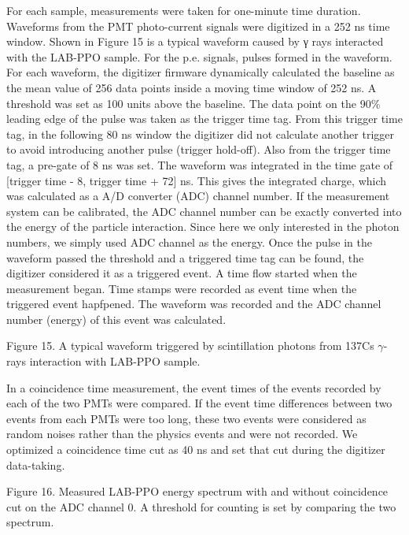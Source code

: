 For each sample, measurements were taken for one-minute time duration. Waveforms from the PMT photo-current signals were digitized in a 252 ns time window. Shown in Figure 15 is a typical waveform caused by γ rays interacted with the LAB-PPO sample. For the p.e. signals, pulses formed in the waveform. For each waveform, the digitizer firmware dynamically calculated the baseline as the mean value of 256 data points inside a moving time window of 252 ns. A threshold was set as 100 units above the baseline. The data point on the 90\% leading edge of the pulse was taken as the trigger time tag. From this trigger time tag, in the following 80 ns window the digitizer did not calculate another trigger to avoid introducing another pulse (trigger hold-off). Also from the trigger time tag, a pre-gate of 8 ns was set. The waveform was integrated in the time gate of  [trigger time - 8,  trigger time + 72] ns. This gives the integrated charge, which was calculated as a A/D converter (ADC) channel number. If the measurement system can be calibrated, the ADC channel number can be exactly converted into the energy of the particle interaction. Since here we only interested in the photon numbers, we simply used ADC channel as the energy. Once the pulse in the waveform passed the threshold and a triggered time tag can be found, the digitizer considered it as a triggered event. A time flow started when the measurement began. Time stamps were recorded as event time when the triggered event hapfpened. The waveform was recorded and the ADC channel number (energy) of this event was calculated.


Figure 15.  A typical waveform triggered by scintillation photons from 137Cs $\gamma$-rays interaction with LAB-PPO sample.

In a coincidence time measurement, the event times of the events recorded by each of the two PMTs were compared. If the event time differences between two events from each PMTs were too long, these two events were considered as random noises rather than the physics events and were not recorded. We optimized a coincidence time cut as 40 ns and set that cut during the digitizer data-taking. 


Figure 16. Measured LAB-PPO energy spectrum with and without coincidence cut on the ADC channel 0.  A threshold for counting is set by comparing the two spectrum. 

